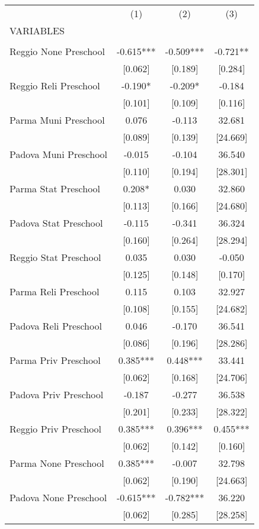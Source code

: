 \begin{tabular}{lccc} \hline
 & (1) & (2) & (3) \\
VARIABLES &  &  &  \\ \hline
 &  &  &  \\
Reggio None Preschool & -0.615*** & -0.509*** & -0.721** \\
 & [0.062] & [0.189] & [0.284] \\
Reggio Reli Preschool & -0.190* & -0.209* & -0.184 \\
 & [0.101] & [0.109] & [0.116] \\
Parma Muni Preschool & 0.076 & -0.113 & 32.681 \\
 & [0.089] & [0.139] & [24.669] \\
Padova Muni Preschool & -0.015 & -0.104 & 36.540 \\
 & [0.110] & [0.194] & [28.301] \\
Parma Stat Preschool & 0.208* & 0.030 & 32.860 \\
 & [0.113] & [0.166] & [24.680] \\
Padova Stat Preschool & -0.115 & -0.341 & 36.324 \\
 & [0.160] & [0.264] & [28.294] \\
Reggio Stat Preschool & 0.035 & 0.030 & -0.050 \\
 & [0.125] & [0.148] & [0.170] \\
Parma Reli Preschool & 0.115 & 0.103 & 32.927 \\
 & [0.108] & [0.155] & [24.682] \\
Padova Reli Preschool & 0.046 & -0.170 & 36.541 \\
 & [0.086] & [0.196] & [28.286] \\
Parma Priv Preschool & 0.385*** & 0.448*** & 33.441 \\
 & [0.062] & [0.168] & [24.706] \\
Padova Priv Preschool & -0.187 & -0.277 & 36.538 \\
 & [0.201] & [0.233] & [28.322] \\
Reggio Priv Preschool & 0.385*** & 0.396*** & 0.455*** \\
 & [0.062] & [0.142] & [0.160] \\
Parma None Preschool & 0.385*** & -0.007 & 32.798 \\
 & [0.062] & [0.190] & [24.663] \\
Padova None Preschool & -0.615*** & -0.782*** & 36.220 \\
 & [0.062] & [0.285] & [28.258] \\

\end{tabular}
